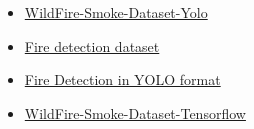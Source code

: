 \begin{itemize}
	\item \href{https://www.kaggle.com/datasets/ahemateja19bec1025/wildfiresmokedatasetyolo}{WildFire-Smoke-Dataset-Yolo}
	\item \href{https://www.kaggle.com/datasets/kabilan03/fire-detection-dataset}{Fire detection dataset}
	\item \href{https://www.kaggle.com/datasets/ankan1998/fire-detection-in-yolo-format}{Fire Detection in YOLO format}
	\item \href{https://www.kaggle.com/datasets/ahemateja19bec1025/wildfiresmokedataset}{WildFire-Smoke-Dataset-Tensorflow}
\end{itemize}




